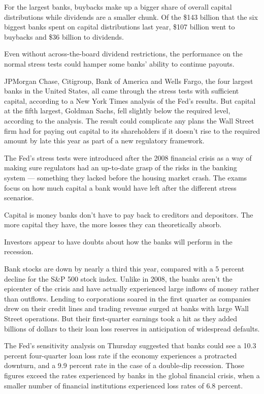 For the largest banks, buybacks make up a bigger share of overall
capital distributions while dividends are a smaller chunk. Of the \$143
billion that the six biggest banks spent on capital distributions last
year, \$107 billion went to buybacks and \$36 billion to dividends.

Even without across-the-board dividend restrictions, the performance on
the normal stress tests could hamper some banks' ability to continue
payouts.

JPMorgan Chase, Citigroup, Bank of America and Wells Fargo, the four
largest banks in the United States, all came through the stress tests
with sufficient capital, according to a New York Times analysis of the
Fed's results. But capital at the fifth largest, Goldman Sachs, fell
slightly below the required level, according to the analysis. The result
could complicate any plans the Wall Street firm had for paying out
capital to its shareholders if it doesn't rise to the required amount by
late this year as part of a new regulatory framework.

The Fed's stress tests were introduced after the 2008 financial crisis
as a way of making sure regulators had an up-to-date grasp of the risks
in the banking system --- something they lacked before the housing
market crash. The exams focus on how much capital a bank would have left
after the different stress scenarios.

Capital is money banks don't have to pay back to creditors and
depositors. The more capital they have, the more losses they can
theoretically absorb.

Investors appear to have doubts about how the banks will perform in the
recession.

Bank stocks are down by nearly a third this year, compared with a 5
percent decline for the S\&P 500 stock index. Unlike in 2008, the banks
aren't the epicenter of the crisis and have actually experienced large
inflows of money rather than outflows. Lending to corporations soared in
the first quarter as companies drew on their credit lines and trading
revenue surged at banks with large Wall Street operations. But their
first-quarter earnings took a hit as they added billions of dollars to
their loan loss reserves in anticipation of widespread defaults.

The Fed's sensitivity analysis on Thursday suggested that banks could
see a 10.3 percent four-quarter loan loss rate if the economy
experiences a protracted downturn, and a 9.9 percent rate in the case of
a double-dip recession. Those figures exceed the rates experienced by
banks in the global financial crisis, when a smaller number of financial
institutions experienced loss rates of 6.8 percent.

